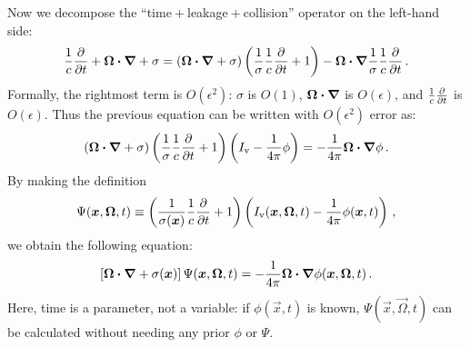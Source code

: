 Now we decompose the ``time${}+{}$leakage${}+{}$collision'' operator on the
left-hand side:
\begin{equation*}
  \frac{1}{c}\frac{\partial }{\partial t}
  + \bm{\Omega}\bm{\cdot} \bm{\nabla}
  + \sigma
  =
  \left( \bm{\Omega}\bm{\cdot} \bm{\nabla} + \sigma \right)
  \left( \frac{1}{\sigma} \frac{1}{c}\frac{\partial }{\partial t} + 1 \right)
  -  \bm{\Omega}\bm{\cdot} \bm{\nabla} \frac{1}{\sigma} \frac{1}{c}\frac{\partial }{\partial t} \,.
\end{equation*}
Formally, the rightmost term is $O(\epsilon^2)$: $\sigma$ is $O(1)$,
$\bm{\Omega}\bm{\cdot}\bm{\nabla}$ is $O(\epsilon)$, and $\frac{1}{c}\frac{\partial }{\partial t}$ is
$O(\epsilon)$. Thus the previous equation can be written with $O(\epsilon^2)$
error as:
\begin{equation*}
  \left( \bm{\Omega}\bm{\cdot} \bm{\nabla} + \sigma \right)
  \left( \frac{1}{\sigma} \frac{1}{c}\frac{\partial }{\partial t} + 1 \right)
   \left( I_\mathrm{v} - \frac{1}{4\pi} \phi \right)
  = - \frac{1}{4\pi} \bm{\Omega}\bm{\cdot} \bm{\nabla} \phi\,.
\end{equation*}
By making the definition
\begin{equation}\label{eq:ap1capPsi}
  \Psi(\bm{x},\bm{\Omega},t)
  \equiv
  \left( \frac{1}{\sigma(\bm{x})} \frac{1}{c}\frac{\partial }{\partial t} + 1 \right)
  \left( I_\mathrm{v}(\bm{x},\bm{\Omega},t) - \frac{1}{4\pi} \phi(\bm{x},t) \right)\,,
\end{equation}
we obtain the following equation:
\begin{equation}\label{eq:ap1Ss}
  \left[ \bm{\Omega}\bm{\cdot} \bm{\nabla} + \sigma(\bm{x}) \right] \Psi(\bm{x},\bm{\Omega},t)
  = - \frac{1}{4\pi} \bm{\Omega}\bm{\cdot} \bm{\nabla} \phi (\bm{x},\bm{\Omega},t)\,.
\end{equation}
Here, time is a parameter, not a variable: if $\phi(\vec{x},t)$ is known,
$\Psi(\vec{x},\vec{\Omega},t)$ can be calculated without needing any prior
$\phi$ or $\Psi$.

